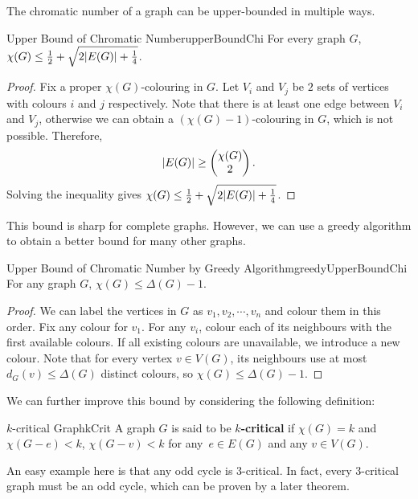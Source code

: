 \documentclass[math]{amznotes}
\theoremstyle{remark}
\newcommand{\0}{\mathbf{0}}
\newcommand{\1}{\mathbf{1}}
\begin{document}
The chromatic number of a graph can be upper-bounded in multiple ways.
\begin{probox}{Upper Bound of Chromatic Number}{upperBoundChi}
    For every graph $G$, $\chi(G) \leq \frac{1}{2} + \sqrt{2{\left\lvert {E(G)} \right\rvert} + \frac{1}{4}}$.
    \tcblower
    \begin{proof}
        Fix a proper $\chi(G)$-colouring in $G$. Let $V_i$ and $V_j$ be $2$ sets of vertices with colours $i$ and $j$ respectively. Note that there is at least one edge between $V_i$ and $V_j$, otherwise we can obtain a $(\chi(G) - 1)$-colouring in $G$, which is not possible. Therefore, 
        \begin{equation*}
            {\left\lvert {E(G)} \right\rvert} \geq \begin{pmatrix}
                \chi(G) \\
                2
            \end{pmatrix}.
        \end{equation*}
        Solving the inequality gives $\chi(G) \leq \frac{1}{2} + \sqrt{2{\left\lvert {E(G)} \right\rvert} + \frac{1}{4}}$.
    \end{proof}
\end{probox}
This bound is sharp for complete graphs. However, we can use a greedy algorithm to obtain a better bound for many other graphs.
\begin{probox}{Upper Bound of Chromatic Number by Greedy Algorithm}{greedyUpperBoundChi}
    For any graph $G$, $\chi(G) \leq \Delta(G) - 1$.
    \tcblower
    \begin{proof}
        We can label the vertices in $G$ as $v_1, v_2, \cdots, v_n$ and colour them in this order. Fix any colour for $v_1$. For any $v_i$, colour each of its neighbours with the first available colours. If all existing colours are unavailable, we introduce a new colour. Note that for every vertex $v \in V(G)$, its neighbours use at most $d_G(v) \leq \Delta(G)$ distinct colours, so $\chi(G) \leq \Delta(G) - 1$.
    \end{proof}
\end{probox}
We can further improve this bound by considering the following definition:
\begin{dfnbox}{$k$-critical Graph}{kCrit}
    A graph $G$ is said to be {\color{red} \textbf{$k$-critical}} if $\chi(G) = k$ and $\chi(G - e) < k$, $\chi(G - v) < k$ for any~$e \in E(G)$ and any $v \in V(G)$.
\end{dfnbox}
An easy example here is that any odd cycle is $3$-critical. In fact, every $3$-critical graph must be an odd cycle, which can be proven by a later theorem.
\end{document}
